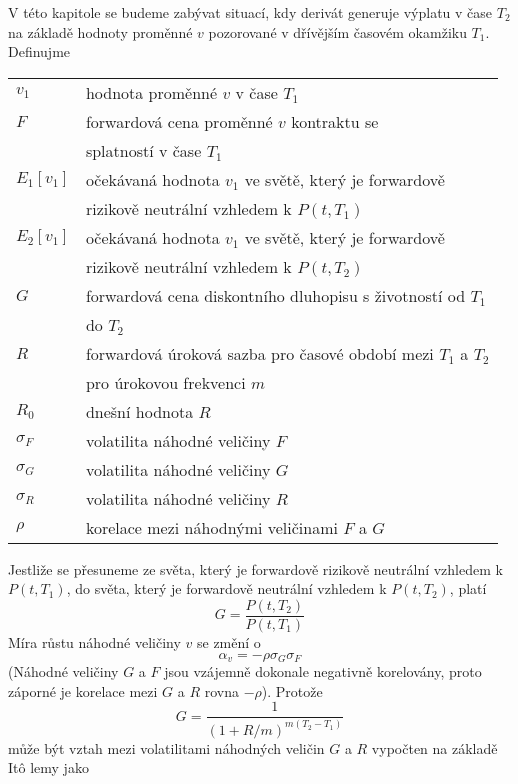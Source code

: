 \documentclass[a4paper]{book}
\begin{document}
V této kapitole se budeme zabývat situací, kdy derivát generuje výplatu v čase $T_2$ na základě hodnoty proměnné $v$ pozorované v dřívějším časovém okamžiku $T_1$. Definujme
\begin{center}
\begin{tabular}{l l}
$v_1$ & hodnota proměnné $v$ v čase $T_1$\\
$F$ & forwardová cena proměnné $v$ kontraktu se\\
 & splatností v čase $T_1$\\
$E_1[v_1]$ & očekávaná hodnota $v_1$ ve světě, který je forwardově\\
 & rizikově neutrální vzhledem k $P(t, T_1)$\\
$E_2[v_1]$ & očekávaná hodnota $v_1$ ve světě, který je forwardově\\
 & rizikově neutrální vzhledem k $P(t, T_2)$\\
$G$ & forwardová cena diskontního dluhopisu s životností od $T_1$\\
 & do $T_2$\\
$R$ & forwardová úroková sazba pro časové období mezi $T_1$ a $T_2$\\
 & pro úrokovou frekvenci $m$\\
$R_0$ & dnešní hodnota $R$\\
$\sigma_F$ & volatilita náhodné veličiny $F$\\
$\sigma_G$ & volatilita náhodné veličiny $G$\\
$\sigma_R$ & volatilita náhodné veličiny $R$\\
$\rho$ & korelace mezi náhodnými veličinami $F$ a $G$\\
\end{tabular}
\end{center}
Jestliže se přesuneme ze světa, který je forwardově rizikově neutrální vzhledem k $P(t,T_1)$, do světa, který je forwardově neutrální vzhledem k $P(t, T_2)$, platí
\begin{equation*}
G = \frac{P(t, T_2)}{P(t, T_1)}
\end{equation*}
Míra růstu náhodné veličiny $v$ se změní o
\begin{equation*}
\alpha_v = - \rho \sigma_G \sigma_F
\end{equation*}
(Náhodné veličiny $G$ a $F$ jsou vzájemně dokonale negativně korelovány, proto záporné je korelace mezi $G$ a $R$ rovna $-\rho$). Protože
\begin{equation*}
G = \frac{1}{(1 + R/m)^{m(T_2 - T_1)}}
\end{equation*}
může být vztah mezi volatilitami náhodných veličin $G$ a $R$ vypočten na základě It\^o lemy jako
\end{document}
